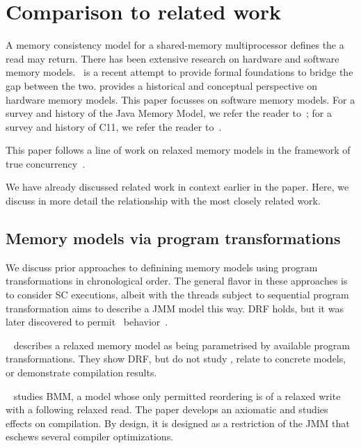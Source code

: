 \section{Comparison to related work}\label{sec:ldrf}
A memory consistency model for a shared-memory multiprocessor defines the a read may return.  There has been extensive research on hardware and software memory models.~\citet{DBLP:journals/pacmpl/PodkopaevLV19} is a recent attempt to provide formal foundations to bridge the gap between the two.  \citet{AlglaveThesis} provides a historical and conceptual perspective on hardware memory models.  This paper focusses on software memory models.   For a survey and history of the Java Memory Model, we refer the reader to~\citet{DBLP:journals/toplas/Lochbihler13}; for a survey and history of C11, we refer the reader to~\citet{DBLP:phd/ethos/Batty15}.  

This paper follows a line of work on relaxed memory models in the framework of true concurrency~\cite{DBLP:conf/lics/JeffreyR16,Pichon-Pharabod:2016:CSR:2837614.2837616,DBLP:conf/esop/CenciarelliKS07}.  

We have already discussed related work in context earlier in the paper.  Here, we discuss in more detail the relationship with the most closely related work.  

\subsection{Memory models via program transformations}
We discuss prior approaches to definining memory models using program transformations in chronological order.  The general flavor in these approaches is to consider SC executions, albeit with the threads subject to sequential program transformation  \citet{Saraswat:2007:TMM:1229428.1229469} aims to describe a JMM model this way.  DRF holds, but it was later discovered to permit  \oota\ behavior~\cite{SP}.

~\cite{DBLP:conf/esop/FerreiraFS10} describes a relaxed memory model as being parametrised by available program transformations.  They show DRF, but do not study \oota, relate to concrete models, or demonstrate compilation results.

~\citet{DBLP:conf/popl/DemangeLZJPV13} studies BMM, a model whose only permitted reordering is of a relaxed write with a following relaxed read.  The paper develops an axiomatic and studies effects on compilation.  By design, it is designed as a restriction of the JMM that eschews several compiler optimizations. 

